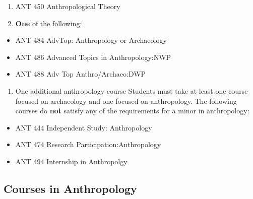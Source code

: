 \documentclass[
  letterpaper,
]{scrbook}
\providecommand{\tightlist}{%
  \setlength{\itemsep}{0pt}\setlength{\parskip}{0pt}}
\begin{document}
\begin{enumerate}
\def\labelenumi{\arabic{enumi}.}
\setcounter{enumi}{3}
\tightlist
\item
  ANT 450 Anthropological Theory
\item
  \textbf{One} of the following:
\end{enumerate}

\begin{itemize}
\tightlist
\item
  ANT 484 AdvTop: Anthropology or Archaeology
\item
  ANT 486 Advanced Topics in Anthropology:NWP
\item
  ANT 488 Adv Top Anthro/Archaeo:DWP
\end{itemize}

\begin{enumerate}
\def\labelenumi{\arabic{enumi}.}
\setcounter{enumi}{5}
\tightlist
\item
  One additional anthropology course Students must take at least one
  course focused on archaeology and one focused on anthropology. The
  following courses do \textbf{not} satisfy any of the requirements for
  a minor in anthropology:
\end{enumerate}

\begin{itemize}
\tightlist
\item
  ANT 444 Independent Study: Anthropology
\item
  ANT 474 Research Participation:Anthropology
\item
  ANT 494 Internship in Anthropolgy
\end{itemize}

\subsection{Courses in Anthropology}\label{courses-in-anthropology}
\end{document}
